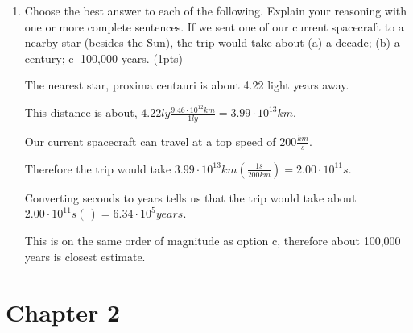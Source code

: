 \documentclass{article}
\begin{document}
\begin{enumerate}
    \item Choose the best answer to each of the following. Explain your reasoning with one or more complete sentences. 
    If we sent one of our current spacecraft to a nearby star (besides the Sun), the trip would take about 
    (a) a decade; 
    (b) a century; 
    \textcircled{c} 100,000 years. (1pts)

    The nearest star, proxima centauri is about 4.22 light years away.
    
    This distance is about, $4.22\si{ly}\frac{9.46 \cdot 10^{12} \si{km}}{1\si{ly}} = 3.99 \cdot 10^{13} \si{km}$.
    
    Our current spacecraft can travel at a top speed of $200 \si{\frac{km}{s}}$.

    Therefore the trip would take $3.99 \cdot 10^{13} \si{km} \left( \frac{1 \si{s}}{200 \si{km}} \right) = 2.00 \cdot 10^{11} \si{s}$.

    Converting seconds to years tells us that the trip would take about $2.00 \cdot 10^{11} \si{s} \left( \frac{}{} \right) = 6.34 \cdot 10^5 \si{years}$.

    This is on the same order of magnitude as option c, therefore about 100,000 years is closest estimate.
    
\end{enumerate}


\section{Chapter 2}
\end{document}
